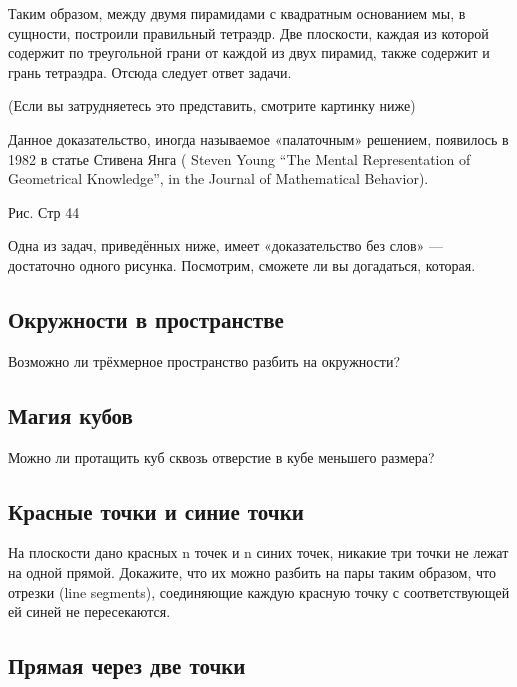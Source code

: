 Таким образом, между двумя пирамидами с квадратным основанием мы, в сущности, построили правильный тетраэдр.
Две плоскости, каждая из которой содержит по треугольной грани от каждой из двух пирамид, также содержит и грань тетраэдра.
Отсюда следует ответ задачи. %


(Если вы затрудняетесь это представить, смотрите картинку ниже)


  Данное доказательство, иногда называемое «палаточным» решением, появилось в 1982 в статье Стивена Янга ( Steven Young  “The Mental Representation of Geometrical Knowledge”, in the Journal of Mathematical Behavior).


                                Рис. Стр 44




Одна из задач, приведённых ниже,  имеет «доказательство без слов» --- достаточно одного рисунка.
Посмотрим, сможете ли вы догадаться, которая.

\subsection*{Окружности в пространстве}%


Возможно ли трёхмерное пространство разбить на окружности?  




\subsection*{Магия кубов}%


Можно ли протащить куб сквозь отверстие в кубе меньшего размера?




\subsection*{Красные точки и синие точки}%


На плоскости дано красных n точек и n синих точек, никакие три точки не лежат на одной прямой.
Докажите, что их можно разбить на пары таким образом, что отрезки (line segments), соединяющие каждую красную точку с соответствующей ей синей не пересекаются.



\subsection*{Прямая через две точки}%


